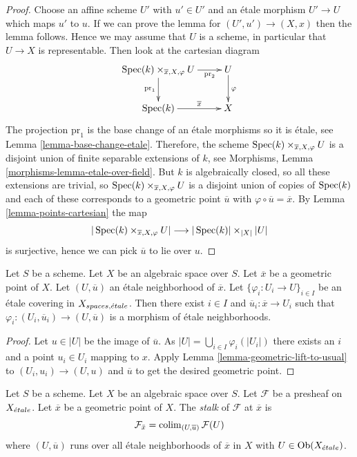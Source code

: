 \begin{proof}
Choose an affine scheme $U'$ with $u' \in U'$ and an \'etale morphism
$U' \to U$ which maps $u'$ to $u$. If we can prove the lemma for
$(U', u') \to (X, x)$ then the lemma follows. Hence we may assume that
$U$ is a scheme, in particular that $U \to X$ is representable.
Then look at the cartesian diagram
$$
\xymatrix{
\Spec(k) \times_{\overline{x}, X, \varphi} U
\ar[d]_{\text{pr}_1} \ar[r]_-{\text{pr}_2} & U
\ar[d]^\varphi \\
\Spec(k) \ar[r]^-{\overline{x}} & X
}
$$
The projection $\text{pr}_1$ is the base change of an \'etale morphisms
so it is \'etale, see
Lemma \ref{lemma-base-change-etale}.
Therefore, the scheme $\mathop{\mathrm{Spec}}(k) \times_{\overline{x}, X, \varphi} U$
is a disjoint union of finite separable extensions of $k$, see
Morphisms, Lemma \ref{morphisms-lemma-etale-over-field}.
But $k$ is algebraically closed, so all these extensions are trivial,
so $\mathop{\mathrm{Spec}}(k) \times_{\overline{x}, X, \varphi} U$
is a disjoint union of copies of $\mathop{\mathrm{Spec}}(k)$ and each of
these corresponds to a geometric point $\overline{u}$ with
$\varphi \circ \overline{u} = \overline{x}$. By
Lemma \ref{lemma-points-cartesian}
the map
$$
|\mathop{\mathrm{Spec}}(k) \times_{\overline{x}, X, \varphi} U|
\longrightarrow
|\mathop{\mathrm{Spec}}(k)| \times_{|X|} |U|
$$
is surjective, hence we can pick $\overline{u}$ to lie over $u$.
\end{proof}

\begin{lemma}
\label{lemma-geometric-lift-to-cover}
Let $S$ be a scheme. Let $X$ be an algebraic space over $S$.
Let $\overline{x}$ be a geometric point of $X$.
Let $(U, \overline{u})$ an \'etale neighborhood of $\overline{x}$.
Let $\{\varphi_i : U_i \to U\}_{i \in I}$ be an \'etale covering in
$X_{spaces, {\acute{e}tale}}$.
Then there exist $i \in I$ and $\overline{u}_i : \overline{x} \to U_i$
such that $\varphi_i : (U_i, \overline{u}_i) \to (U, \overline{u})$
is a morphism of \'etale neighborhoods.
\end{lemma}

\begin{proof}
Let $u \in |U|$ be the image of $\overline{u}$.
As $|U| = \bigcup_{i \in I} \varphi_i(|U_i|)$ there exists an
$i$ and a point $u_i \in U_i$ mapping to $x$. Apply
Lemma \ref{lemma-geometric-lift-to-usual}
to $(U_i, u_i) \to (U, u)$ and $\overline{u}$ to
get the desired geometric point.
\end{proof}

\begin{definition}
\label{definition-stalk}
Let $S$ be a scheme. Let $X$ be an algebraic space over $S$.
Let $\mathcal{F}$ be a presheaf on $X_{\acute{e}tale}$.
Let $\overline{x}$ be a geometric point of $X$.
The {\it stalk} of $\mathcal{F}$ at $\overline{x}$ is
$$
\mathcal{F}_{\bar x}
=
\mathop{\mathrm{colim}}\nolimits_{(U, \overline{u})} \mathcal{F}(U)
$$
where $(U, \overline{u})$ runs over all \'etale neighborhoods
of $\overline{x}$ in $X$ with $U \in \mathop{\mathrm{Ob}}\nolimits(X_{\acute{e}tale})$.
\end{definition}


